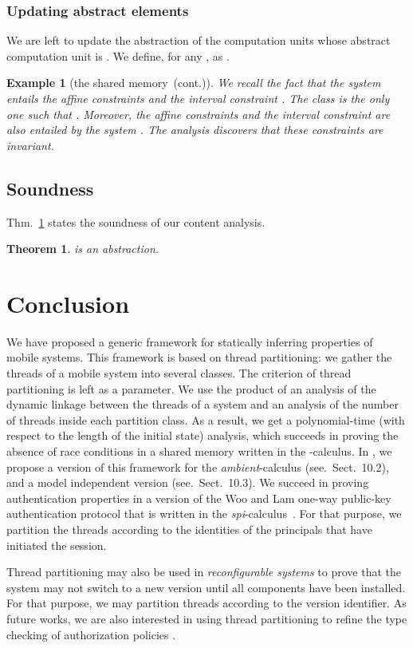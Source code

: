 \documentclass{article}
\newcommand{\boxexample}{}
\newtheorem{example}[thm]{Example}
\newtheorem{theorem}[thm]{Theorem}
\newcommand{\picalcul}{-calculus}
\newcommand{\ambient}{\emph{ambient}}
\newcommand{\spicalcul}{{\emph{spi}-calculus}}
\newcommand{\continued}{(cont.)}
\newcommand{\shareanalysis}{the shared memory}
\newcommand{\ccontentanalysis}{\shareanalysis\ \continued}
\begin{document}
\subsubsection{Updating abstract elements}
We are left to update the abstraction of the computation units whose 
abstract computation unit is . We define, for any ,  as .

\begin{example}[\ccontentanalysis]
We recall the fact that the system  entails the affine constraints  and the interval constraint . 
The class  is the only one such that 
. Moreover,  the affine constraints  and the interval constraint  are also entailed by the system . The analysis discovers that these constraints are invariant.
\boxexample\end{example}

\subsection{Soundness}

Thm.~\ref{contsound} states the soundness of our content analysis.

\begin{theorem}
\label{contsound}
 is an abstraction.
\end{theorem}


\section{Conclusion}

We have proposed a generic framework for statically inferring properties of mobile systems. This framework is based on thread partitioning: we gather the threads of a mobile system into several classes. The criterion of thread partitioning is left as a parameter. We use the product of an analysis of the dynamic linkage between the threads of a system and an analysis of the number of threads inside each partition class. As a result, we get a polynomial-time (with respect to the length of the initial state) analysis, which succeeds in proving the absence of race conditions in a shared memory  written in the \picalcul.
In \cite[Chap:10]{feret:thesis}, we propose a version of this framework for the \ambient-calculus (see.~Sect.~10.2), and a model independent version (see.~Sect.~10.3). 
We succeed in proving authentication properties in a version \cite{Woo} of the Woo and Lam one-way public-key authentication protocol that is written in the \spicalcul\ \cite{spi}. For that purpose, we partition the threads according to the identities of the principals that have initiated the session. 

Thread partitioning may also be used in \emph{reconfigurable systems} to prove that the system may not switch to a new version until all components have  been installed. For that purpose, we may partition threads according to the version identifier. As future works, we are also  interested in using thread partitioning to refine the type checking of authorization policies \cite{authorization}.






\end{document}
